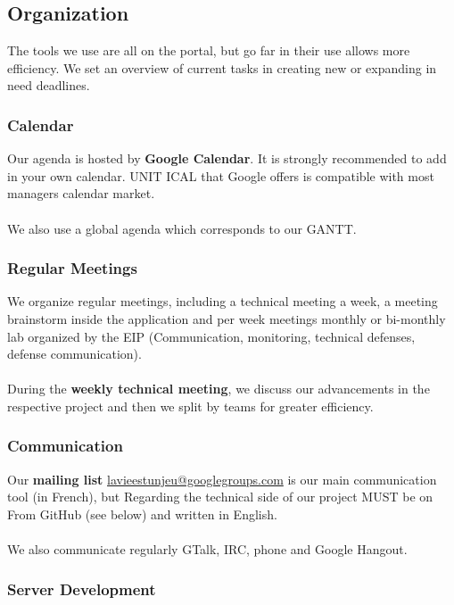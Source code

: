 \documentclass{life-fr}
\begin{document}
\subsection{Organization}

The tools we use are all on the portal, but go
far in their use allows more efficiency. We set
an overview of current tasks in creating new or expanding in
need deadlines.

\subsubsection{Calendar}

Our agenda is hosted by \textbf{Google Calendar}. It is strongly
recommended to add in your own calendar. UNIT
ICAL that Google offers is compatible with most managers
calendar market.\\
\\
We also use a global agenda which corresponds to our
GANTT.

\subsubsection{Regular Meetings}

We organize regular meetings, including a technical meeting
a week, a meeting brainstorm inside the application and per week
meetings monthly or bi-monthly lab organized by the EIP
(Communication, monitoring, technical defenses, defense communication).\\
\\
During the \textbf{weekly technical meeting}, we discuss our
advancements in the respective project and then we split by
teams for greater efficiency.

\subsubsection{Communication}

Our \textbf{mailing list} \href{mailto:lavieestunjeu@googlegroups.com}{lavieestunjeu@googlegroups.com}
is our main communication tool (in French), but
Regarding the technical side of our project MUST be on
From GitHub (see below) and written in English.\\
\\
We also communicate regularly GTalk, IRC, phone
and Google Hangout.

\subsubsection{Server Development}
\end{document}
